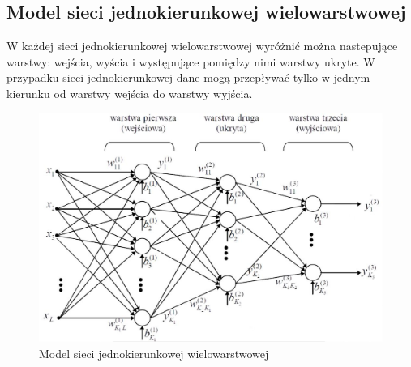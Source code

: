 \documentclass[12pt,twoside]{article}
\begin{document}
\subsection{Model sieci jednokierunkowej wielowarstwowej}
W każdej sieci jednokierunkowej wielowarstwowej wyróżnić można nastepujące warstwy: wejścia, wyścia i występujące pomiędzy nimi warstwy ukryte.
W przypadku sieci jednokierunkowej dane mogą przepływać tylko w jednym kierunku od warstwy wejścia do warstwy wyjścia.
\begin{figure}[ht!]
	\centering
	\includegraphics[width=12cm]{figures/model_sieci.png}
	\caption{Model sieci jednokierunkowej wielowarstwowej}
	\label{Fig:model_sieci}
\end{figure}
\end{document}

